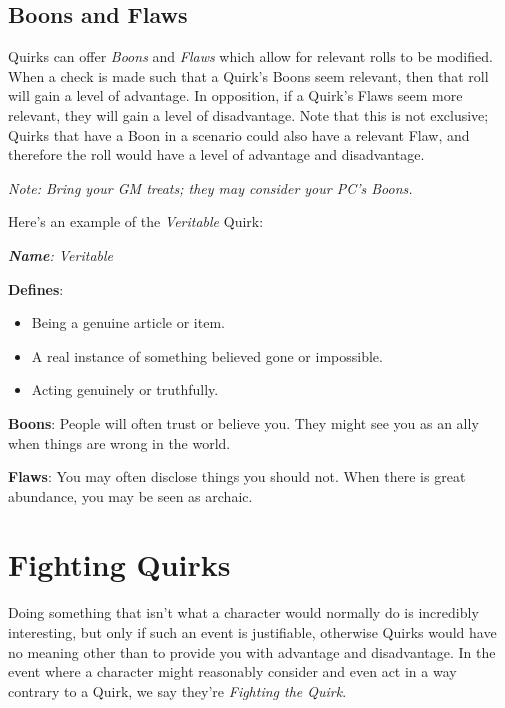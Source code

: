 \documentclass[../main.tex]{subfiles}
\begin{document}
    \subsection{Boons and Flaws}

        Quirks can offer \emph{Boons} and \emph{Flaws} which allow for relevant rolls to be modified. When a check is made such that a Quirk's Boons seem relevant, then that roll will gain a level of advantage. In opposition, if a Quirk's Flaws seem more relevant, they will gain a level of disadvantage. Note that this is not exclusive; Quirks that have a Boon in a scenario could also have a relevant Flaw, and therefore the roll would have a level of advantage and disadvantage.

        \emph{Note: Bring your GM treats; they may consider your PC's Boons.}
        \begin{mdframed}[style=Arrata]
            Here's an example of the \emph{Veritable} Quirk:

            {\em
                \textbf{Name}: Veritable
            
                \textbf{Defines}:
            
                \begin{itemize}
                    \item Being a genuine article or item.
                    \item A real instance of something believed gone or impossible.
                    \item Acting genuinely or truthfully.
                \end{itemize}
            
                \textbf{Boons}: People will often trust or believe you. They might see you as an ally when things are wrong in the world.
            
                \textbf{Flaws}: You may often disclose things you should not. When there is great abundance, you may be seen as archaic.
            }
        \end{mdframed}

    \section{Fighting Quirks}

        Doing something that isn't what a character would normally do is incredibly interesting, but only if such an event is justifiable, otherwise Quirks would have no meaning other than to provide you with advantage and disadvantage. In the event where a character might reasonably consider and even act in a way contrary to a Quirk, we say they're \emph{Fighting the Quirk}.
\end{document}
